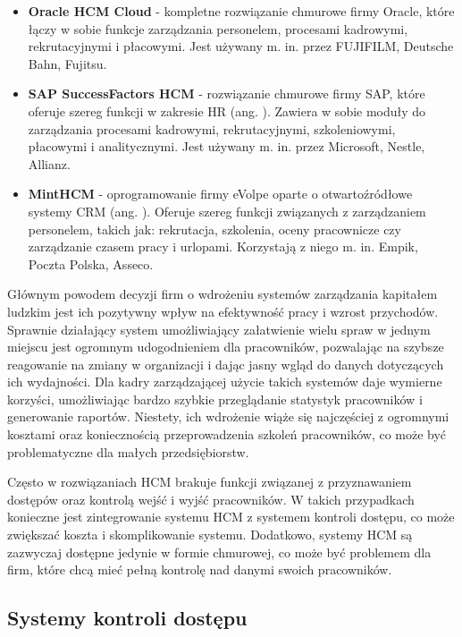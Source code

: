 \begin{itemize}
    \item \textbf{Oracle HCM Cloud}\cite{bib:OracleHCM} - kompletne rozwiązanie chmurowe firmy Oracle, które łączy w sobie funkcje zarządzania personelem, procesami kadrowymi, rekrutacyjnymi i płacowymi. Jest używany m. in. przez FUJIFILM, Deutsche Bahn, Fujitsu.
    \item \textbf{SAP SuccessFactors HCM}\cite{bib:SAPHCM} - rozwiązanie chmurowe firmy SAP, które oferuje szereg funkcji w zakresie HR (ang. ). Zawiera w sobie moduły do zarządzania procesami kadrowymi, rekrutacyjnymi, szkoleniowymi, płacowymi i analitycznymi. Jest używany m. in. przez Microsoft, Nestle, Allianz.
    \item \textbf{MintHCM}\cite{bib:MintHCM} - oprogramowanie firmy eVolpe oparte o otwartoźródłowe systemy CRM (ang. ). Oferuje szereg funkcji związanych z zarządzaniem personelem, takich jak: rekrutacja, szkolenia, oceny pracownicze czy zarządzanie czasem pracy i urlopami.  Korzystają z niego m. in. Empik, Poczta Polska, Asseco.
\end{itemize}

Głównym powodem decyzji firm o wdrożeniu systemów zarządzania kapitałem ludzkim jest ich pozytywny wpływ na efektywność pracy i wzrost przychodów. Sprawnie działający system umożliwiający załatwienie wielu spraw w jednym miejscu jest ogromnym udogodnieniem dla pracowników, pozwalając na szybsze reagowanie na zmiany w organizacji i dając jasny wgląd do danych dotyczących ich wydajności. Dla kadry zarządzającej użycie takich systemów daje wymierne korzyści, umożliwiając bardzo szybkie przeglądanie statystyk pracowników i generowanie raportów. Niestety, ich wdrożenie wiąże się najczęściej z ogromnymi kosztami oraz koniecznością przeprowadzenia szkoleń pracowników, co może być problematyczne dla małych przedsiębiorstw.

Często w rozwiązaniach HCM brakuje funkcji związanej z przyznawaniem dostępów oraz kontrolą wejść i wyjść pracowników. W takich przypadkach konieczne jest zintegrowanie systemu HCM z systemem kontroli dostępu, co może zwiększać koszta i skomplikowanie systemu. Dodatkowo, systemy HCM są zazwyczaj dostępne jedynie w formie chmurowej, co może być problemem dla firm, które chcą mieć pełną kontrolę nad danymi swoich pracowników.

\subsection{Systemy kontroli dostępu}

